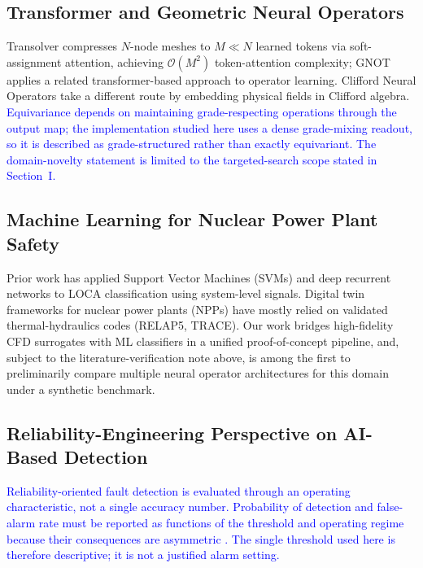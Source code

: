 \documentclass[journal]{IEEEtran}
\newcommand{\added}[1]{\textcolor{blue}{#1}}
\begin{document}
\subsection{Transformer and Geometric Neural Operators}
Transolver \cite{wu2024transolver} compresses $N$-node meshes to $M \ll N$ learned tokens via soft-assignment attention, achieving $\mathcal{O}(M^2)$ token-attention complexity; GNOT \cite{hao2023gnot} applies a related transformer-based approach to operator learning. Clifford Neural Operators \cite{brandstetter2023clifford} take a different route by embedding physical fields in Clifford algebra.  \added{Equivariance depends on maintaining grade-respecting operations through the output map; the implementation studied here uses a dense grade-mixing readout, so it is described as grade-structured rather than exactly equivariant. The domain-novelty statement is limited to the targeted-search scope stated in Section~I.}

\subsection{Machine Learning for Nuclear Power Plant Safety}
Prior work has applied Support Vector Machines (SVMs) \cite{song2018} and deep recurrent networks \cite{choi2019} to LOCA classification using system-level signals. Digital twin frameworks for nuclear power plants (NPPs) \cite{grieves2014, liu2022npp} have mostly relied on validated thermal-hydraulics codes (RELAP5, TRACE). Our work bridges high-fidelity CFD surrogates with ML classifiers in a unified proof-of-concept pipeline, and, subject to the literature-verification note above, is among the first to preliminarily compare multiple neural operator architectures for this domain under a synthetic benchmark.

\subsection{Reliability-Engineering Perspective on AI-Based Detection}
\label{sec:related_reliability}


\added{Reliability-oriented fault detection is evaluated through an operating characteristic, not a single accuracy number. Probability of detection and false-alarm rate must be reported as functions of the threshold and operating regime because their consequences are asymmetric \cite{isermann2005}. The single threshold used here is therefore descriptive; it is not a justified alarm setting.}
\end{document}
